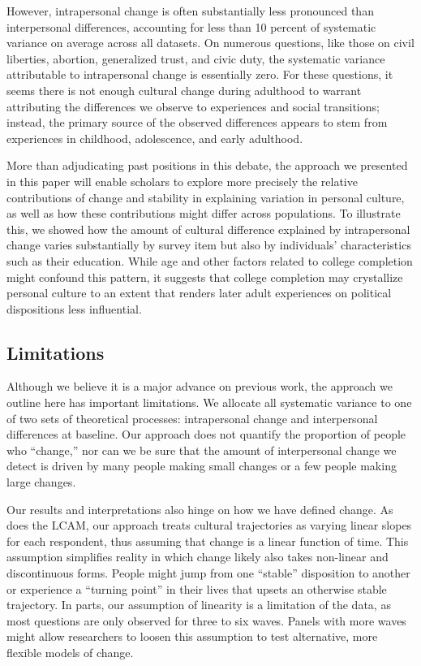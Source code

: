 \documentclass[
  12pt,
]{article}
\begin{document}
However, intrapersonal change is often substantially less pronounced
than interpersonal differences, accounting for less than 10 percent of
systematic variance on average across all datasets. On numerous
questions, like those on civil liberties, abortion, generalized trust,
and civic duty, the systematic variance attributable to intrapersonal
change is essentially zero. For these questions, it seems there is not
enough cultural change during adulthood to warrant attributing the
differences we observe to experiences and social transitions; instead,
the primary source of the observed differences appears to stem from
experiences in childhood, adolescence, and early adulthood.

More than adjudicating past positions in this debate, the approach we
presented in this paper will enable scholars to explore more precisely
the relative contributions of change and stability in explaining
variation in personal culture, as well as how these contributions might
differ across populations. To illustrate this, we showed how the amount
of cultural difference explained by intrapersonal change varies
substantially by survey item but also by individuals' characteristics
such as their education. While age and other factors related to college
completion might confound this pattern, it suggests that college
completion may crystallize personal culture to an extent that renders
later adult experiences on political dispositions less influential.

\hypertarget{limitations}{%
\subsection{Limitations}\label{limitations}}

Although we believe it is a major advance on previous work, the approach
we outline here has important limitations. We allocate all systematic
variance to one of two sets of theoretical processes: intrapersonal
change and interpersonal differences at baseline. Our approach does not
quantify the proportion of people who ``change,'' nor can we be sure
that the amount of interpersonal change we detect is driven by many
people making small changes or a few people making large changes.

Our results and interpretations also hinge on how we have defined
change. As does the LCAM, our approach treats cultural trajectories as
varying linear slopes for each respondent, thus assuming that change is
a linear function of time. This assumption simplifies reality in which
change likely also takes non-linear and discontinuous forms. People
might jump from one ``stable'' disposition to another or experience a
``turning point'' in their lives that upsets an otherwise stable
trajectory. In parts, our assumption of linearity is a limitation of the
data, as most questions are only observed for three to six waves. Panels
with more waves might allow researchers to loosen this assumption to
test alternative, more flexible models of change.
\end{document}
